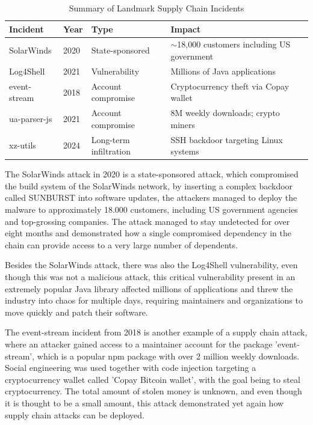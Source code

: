 \begin{table}[htbp]
\centering
\caption{Summary of Landmark Supply Chain Incidents}
\label{tab:landmark-incidents}
\begin{tabular}{|l|l|l|p{5cm}|}
\hline
\textbf{Incident} & \textbf{Year} & \textbf{Type} & \textbf{Impact} \\
\hline
SolarWinds & 2020 & State-sponsored & $\sim$18,000 customers including US government \\
\hline
Log4Shell & 2021 & Vulnerability & Millions of Java applications \\
\hline
event-stream & 2018 & Account compromise & Cryptocurrency theft via Copay wallet \\
\hline
ua-parser-js & 2021 & Account compromise & 8M weekly downloads; crypto miners \\
\hline
xz-utils & 2024 & Long-term infiltration & SSH backdoor targeting Linux systems \\
\hline
\end{tabular}
\end{table}

The SolarWinds attack in 2020 is a state-sponsored attack, which compromised the build system of the SolarWinds network, by inserting a complex backdoor called SUNBURST into software updates, the attackers managed to deploy the malware to approximately 18.000 customers, including US government agencies and top-grossing companies. The attack managed to stay undetected for over eight months and demonstrated how a single compromised dependency in the chain can provide access to a very large number of dependents.

Besides the SolarWinds attack, there was also the Log4Shell vulnerability, even though this was not a malicious attack, this critical vulnerability present in an extremely popular Java library affected millions of applications and threw the industry into chaos for multiple days, requiring maintainers and organizations to move quickly and patch their software.

The event-stream incident from 2018 is another example of a supply chain attack, where an attacker gained access to a maintainer account for the package 'event-stream', which is a popular npm package with over 2 million weekly downloads. Social engineering was used together with code injection targeting a cryptocurrency wallet called 'Copay Bitcoin wallet', with the goal being to steal cryptocurrency. The total amount of stolen money is unknown, and even though it is thought to be a small amount, this attack demonstrated yet again how supply chain attacks can be deployed.


